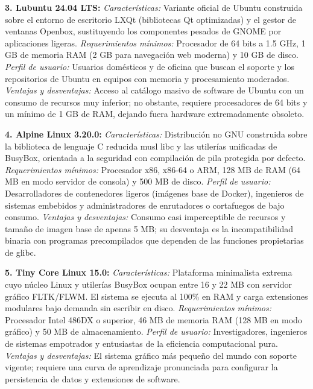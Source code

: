 \documentclass[12pt]{article}
\begin{document}
\smallskip
\noindent\textbf{3. Lubuntu 24.04 LTS:}
\textit{Características:} Variante oficial de Ubuntu construida sobre el entorno de escritorio LXQt (bibliotecas Qt optimizadas) y el gestor de ventanas Openbox, sustituyendo los componentes pesados de GNOME por aplicaciones ligeras.
\textit{Requerimientos mínimos:} Procesador de 64 bits a 1.5 GHz, 1 GB de memoria RAM (2 GB para navegación web moderna) y 10 GB de disco.
\textit{Perfil de usuario:} Usuarios domésticos y de oficina que buscan el soporte y los repositorios de Ubuntu en equipos con memoria y procesamiento moderados.
\textit{Ventajas y desventajas:} Acceso al catálogo masivo de software de Ubuntu con un consumo de recursos muy inferior; no obstante, requiere procesadores de 64 bits y un mínimo de 1 GB de RAM, dejando fuera hardware extremadamente obsoleto.

\smallskip
\noindent\textbf{4. Alpine Linux 3.20.0:}
\textit{Características:} Distribución no GNU construida sobre la biblioteca de lenguaje C reducida musl libc y las utilerías unificadas de BusyBox, orientada a la seguridad con compilación de pila protegida por defecto.
\textit{Requerimientos mínimos:} Procesador x86, x86-64 o ARM, 128 MB de RAM (64 MB en modo servidor de consola) y 500 MB de disco.
\textit{Perfil de usuario:} Desarrolladores de contenedores ligeros (imágenes base de Docker), ingenieros de sistemas embebidos y administradores de enrutadores o cortafuegos de bajo consumo.
\textit{Ventajas y desventajas:} Consumo casi imperceptible de recursos y tamaño de imagen base de apenas 5 MB; su desventaja es la incompatibilidad binaria con programas precompilados que dependen de las funciones propietarias de glibc.

\smallskip
\noindent\textbf{5. Tiny Core Linux 15.0:}
\textit{Características:} Plataforma minimalista extrema cuyo núcleo Linux y utilerías BusyBox ocupan entre 16 y 22 MB con servidor gráfico FLTK/FLWM. El sistema se ejecuta al 100\% en RAM y carga extensiones modulares bajo demanda sin escribir en disco.
\textit{Requerimientos mínimos:} Procesador Intel 486DX o superior, 46 MB de memoria RAM (128 MB en modo gráfico) y 50 MB de almacenamiento.
\textit{Perfil de usuario:} Investigadores, ingenieros de sistemas empotrados y entusiastas de la eficiencia computacional pura.
\textit{Ventajas y desventajas:} El sistema gráfico más pequeño del mundo con soporte vigente; requiere una curva de aprendizaje pronunciada para configurar la persistencia de datos y extensiones de software.
\end{document}
